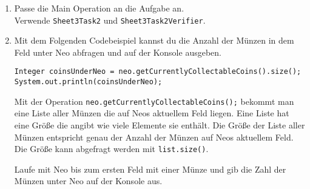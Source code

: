 
\begin{enumerate}
	\item
		Passe die Main Operation an die Aufgabe an.\\
		Verwende \lstinline{Sheet3Task2} und \lstinline{Sheet3Task2Verifier}.

	\item 
		Mit dem Folgenden Codebeispiel kannst du die Anzahl der Münzen in dem Feld unter Neo abfragen und auf der Konsole ausgeben.

		\begin{lstlisting}
Integer coinsUnderNeo = neo.getCurrentlyCollectableCoins().size();
System.out.println(coinsUnderNeo);
		\end{lstlisting}

		Mit der Operation \lstinline{neo.getCurrentlyCollectableCoins();} bekommt man eine Liste aller Münzen die auf Neos aktuellem Feld liegen. 
		Eine Liste hat eine Größe die angibt wie viele Elemente sie enthält. 
		Die Größe der Liste aller Münzen entspricht genau der Anzahl der Münzen auf Neos aktuellem Feld. 
		Die Größe kann abgefragt werden mit \lstinline{list.size()}. 

		Laufe mit Neo bis zum ersten Feld mit einer Münze und gib die Zahl der Münzen unter Neo auf der Konsole aus.
\end{enumerate}


